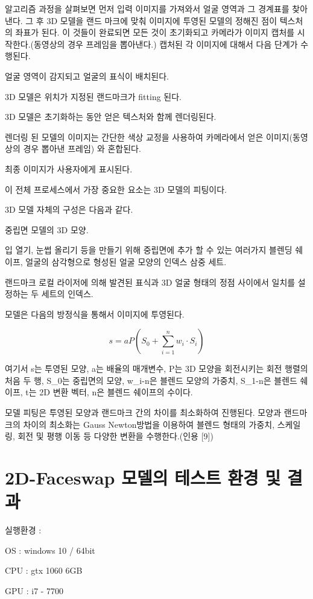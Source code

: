 \documentclass{oblivoir}
\begin{document}
알고리즘 과정을 살펴보면 먼저 입력 이미지를 가져와서 얼굴 영역과 그 경계표를 찾아낸다. 그 후 3D 모델을 랜드 마크에 맞춰 이미지에 투영된 모델의 정해진 점이 텍스처의 좌표가 된다. 이 것들이 완료되면 모든 것이 초기화되고 카메라가 이미지 캡처를 시작한다.(동영상의 경우 프레임을 뽑아낸다.) 캡처된 각 이미지에 대해서 다음 단계가 수행된다.

얼굴 영역이 감지되고 얼굴의 표식이 배치된다.

3D 모델은 위치가 지정된 랜드마크가 fitting 된다.

3D 모델은 초기화하는 동안 얻은 텍스처와 함께 렌더링된다.

렌더링 된 모델의 이미지는 간단한 색상 교정을 사용하여 카메라에서 얻은 이미지(동영상의 경우 뽑아낸 프레임) 와 혼합된다.

최종 이미지가 사용자에게 표시된다.

이 전체 프로세스에서 가장 중요한 요소는 3D 모델의 피팅이다. 

3D 모델 자체의 구성은 다음과 같다.

중립면 모델의 3D 모양.

입 열기, 눈썹 올리기 등을 만들기 위해 중립면에 추가 할 수 있는 여러가지 블렌딩 쉐이프, 얼굴의 삼각형으로 형성된 얼굴 모양의 인덱스 삼중 세트.

랜드마크 로컬 라이저에 의해 발견된 표식과 3D 얼굴 형태의 정점 사이에서 일치를 설정하는 두 세트의 인덱스.

모델은 다음의 방정식을 통해서 이미지에 투영된다.

\[ s = aP \left( S_{0} + \sum_{i=1}^{n} w_{i}\cdot S_{i}  \right)   \]

여기서 s는 투영된 모양, a는 배율의 매개변수, P는 3D 모양을 회전시키는 회전 행렬의 처음 두 행, S_0는 중립면의 모양, w_i-n은 블렌드 모양의 가중치, S_1-n은 블렌드 쉐이프, t는 2D 변환 벡터, n은 블렌드 쉐이프의 수이다.

모델 피팅은 투영된 모양과 랜드마크 간의 차이를 최소화하여 진행된다. 모양과 랜드마크의 차이의 최소화는 Gauss Newton방법을 이용하여 블렌드 형태의 가중치, 스케일링, 회전 및 평행 이동 등 다양한 변환을 수행한다.(인용 [9])

\section{2D-Faceswap 모델의 테스트 환경 및 결과}

실행환경 :

 OS : windows 10 / 64bit

 CPU : gtx 1060 6GB

 GPU : i7 - 7700
\end{document}
